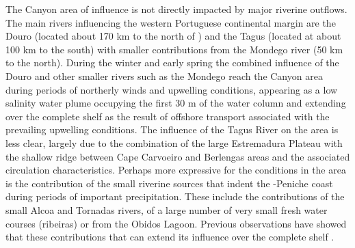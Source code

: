 
The \naz Canyon area of influence is not directly impacted by major
riverine outflows. The main rivers influencing the western Portuguese
continental margin are the Douro (located about 170 km to the north of
\naze) and the Tagus (located at about 100 km to the south) with
smaller contributions from the Mondego river (50 km to the
north). During the winter and early spring the combined influence of
the Douro and other smaller rivers such as the Mondego reach the \naz
Canyon area during periods of northerly winds and upwelling
conditions, appearing as a low salinity water plume occupying the
first 30 m of the water column and extending over the complete shelf
as the result of offshore transport associated with the prevailing
upwelling conditions. The influence of the Tagus River on the area is
less clear, largely due to the combination of the large Estremadura
Plateau with the shallow ridge between Cape Carvoeiro and Berlengas
areas and the associated circulation characteristics. Perhaps more
expressive for the conditions in the area is the contribution of the
small riverine sources that indent the \naze-Peniche coast during
periods of important precipitation. These include the contributions of
the small Alcoa and Tornadas rivers, of a large number of very small
fresh water courses (ribeiras) or from the Obidos Lagoon. Previous
observations have showed  that these contributions
 that can
extend its influence over the complete shelf .

